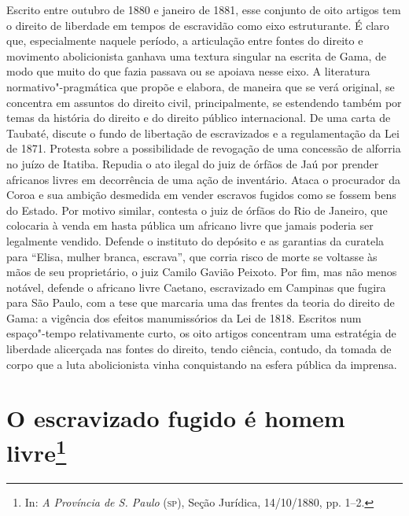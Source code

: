 {\footnotesize\noindent
Escrito entre outubro de 1880 e janeiro de 1881, esse conjunto de
oito artigos tem o direito de liberdade em tempos de escravidão como
eixo estruturante. É claro que, especialmente naquele período, a
articulação entre fontes do direito e movimento abolicionista ganhava
uma textura singular na escrita de Gama, de modo que muito do que fazia
passava ou se apoiava nesse eixo. A literatura normativo"-pragmática que
propõe e elabora, de maneira que se verá original, se concentra em
assuntos do direito civil, principalmente, se estendendo também por
temas da história do direito e do direito público internacional. De uma
carta de Taubaté, discute o fundo de libertação de escravizados e a
regulamentação da Lei de 1871. Protesta sobre a possibilidade de
revogação de uma concessão de alforria no juízo de Itatiba. Repudia o
ato ilegal do juiz de órfãos de Jaú por prender africanos livres em
decorrência de uma ação de inventário. Ataca o procurador da Coroa e sua
ambição desmedida em vender escravos fugidos como se fossem bens do
Estado. Por motivo similar, contesta o juiz de órfãos do Rio de Janeiro,
que colocaria à venda em hasta pública um africano livre que jamais
poderia ser legalmente vendido. Defende o instituto do depósito e as
garantias da curatela para ``Elisa, mulher branca, escrava'', que corria
risco de morte se voltasse às mãos de seu proprietário, o juiz Camilo
Gavião Peixoto. Por fim, mas não menos notável, defende o africano
livre Caetano, escravizado em Campinas que fugira para São Paulo, com a
tese que marcaria uma das frentes da teoria do direito de Gama: a
vigência dos efeitos manumissórios da Lei de 1818. Escritos num
espaço"-tempo relativamente curto, os oito artigos concentram uma
estratégia de liberdade alicerçada nas fontes do direito, tendo ciência,
contudo, da tomada de corpo que a luta abolicionista vinha conquistando
na esfera pública da imprensa.}
\@openrighttrue\makeatother \endgroup


\chapter{O escravizado fugido é homem livre\footnote[*]{In: \emph{A Província de S.
  Paulo} (\textsc{sp}), Seção Jurídica, 14/10/1880, pp. 1--2.}}

